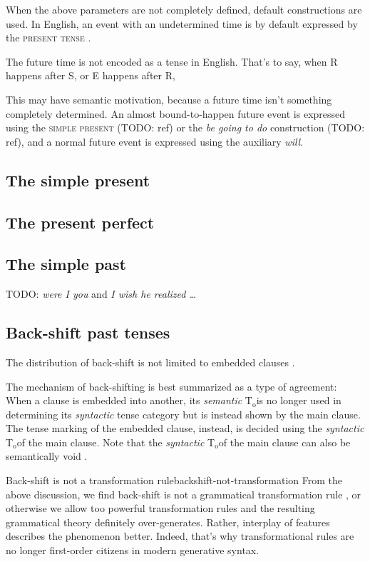 \documentclass[UTF8, a4paper, oneside, scheme=plain]{ctexrep}
\newcommand*{\citepage}[1]{p.~{#1}}
\newcommand*{\citepages}[1]{pp.~{#1}}
\newcommand{\corpus}[1]{\emph{#1}}
\newcommand{\orientationtime}{T$_{\text{o}}$}
\newcommand{\category}[1]{\textsc{#1}}
\begin{document}
When the above parameters are not completely defined,
default constructions are used.
In English, an event with an undetermined time 
is by default expressed by the \category{present tense} \citep[\citepage{129}]{cgel}.

The future time is not encoded as a tense in English.
That's to say, when R happens after S, or E happens after R,

This may have semantic motivation,
because a future time isn't something completely determined.
An almost bound-to-happen future event 
is expressed using the \category{simple present} (TODO: ref)
or the \corpus{be going to do} construction (TODO: ref),
and a normal future event is expressed using the auxiliary \corpus{will}.

\subsection{The simple present}

\subsection{The present perfect}

\subsection{The simple past}

TODO: \corpus{were I you} and \corpus{I wish he realized \dots} \citep[\citepage{153}, {[15]}]{cgel}

\subsection{Back-shift past tenses}

The distribution of back-shift is not limited to embedded clauses \citep[\citepages{152-154}]{cgel}.

The mechanism of back-shifting is best summarized as a type of agreement:
When a clause is embedded into another,
its \emph{semantic} \orientationtime is no longer used in determining its \emph{syntactic} tense category
but is instead shown by the main clause.
The tense marking of the embedded clause,
instead, is decided using the \emph{syntactic} \orientationtime of the main clause.
Note that the \emph{syntactic} \orientationtime of the main clause 
can also be semantically void \citep[\citepage{154}, {[15i]}]{cgel}.

\begin{infobox}{Back-shift is not a transformation rule}{backshift-not-transformation}
    From the above discussion, 
    we find back-shift is not a grammatical transformation rule
    \citep[\citepage{155}]{cgel},
    or otherwise we allow too powerful transformation rules 
    and the resulting grammatical theory definitely over-generates.
    Rather, interplay of features describes the phenomenon better.
    Indeed, that's why transformational rules 
    are no longer first-order citizens in modern generative syntax.
\end{infobox}
\end{document}
